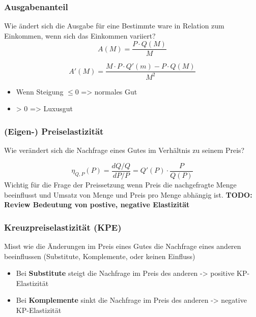 \subsubsection{Ausgabenanteil}

Wie ändert sich die Ausgabe für eine Bestimmte ware in Relation zum Einkommen, wenn sich das Einkommen variiert?
\begin{equation}
    A(M) = \frac{P \cdot Q(M)}{M}
\end{equation}

\begin{equation}
    A'(M) = \frac{M\cdot P \cdot Q'(m) - P \cdot Q(M)}{M^2}
\end{equation}

\begin{itemize}
    \item Wenn Steigung $\le 0$ => normales Gut
    \item > 0 => Luxusgut
\end{itemize}

\subsubsection{(Eigen-) Preiselastizität}
Wie verändert sich die Nachfrage eines Gutes im Verhältnis zu seinem Preis? 

\begin{equation}
    \eta_{Q,P}(P) = \frac{dQ / Q}{dP / P} = Q'(P) \cdot \frac{P}{Q(P)}
\end{equation}
Wichtig für die Frage der Preissetzung wenn Preis die nachgefragte Menge beeinflusst und Umsatz von Menge und Preis pro Menge abhängig ist.
\textbf{TODO: Review Bedeutung von postive, negative Elastizität}

\subsubsection{Kreuzpreiselastizität (KPE)}
Misst wie die Änderungen im Preis eines Gutes die Nachfrage eines anderen beeinflussen (Substitute, Komplemente, oder keinen Einfluss)

\begin{itemize}
    \item Bei \textbf{Substitute} steigt die Nachfrage im Preis des anderen -> positive KP-Elastizität
    \item Bei \textbf{Komplemente} sinkt die Nachfrage im Preis des anderen -> negative KP-Elastizität
\end{itemize}

